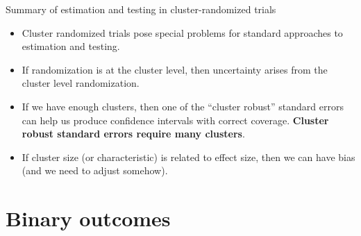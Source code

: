 \documentclass[
  ignorenonframetext,
]{beamer}
\begin{document}
\begin{frame}{Summary of estimation and testing in cluster-randomized
trials}
\protect\hypertarget{summary-of-estimation-and-testing-in-cluster-randomized-trials}{}
\begin{itemize}
\item
  Cluster randomized trials pose special problems for standard
  approaches to estimation and testing.
\item
  If randomization is at the cluster level, then uncertainty arises from
  the cluster level randomization.
\item
  If we have enough clusters, then one of the ``cluster robust''
  standard errors can help us produce confidence intervals with correct
  coverage. \textbf{Cluster robust standard errors require many
  clusters}.
\item
  If cluster size (or characteristic) is related to effect size, then we
  can have bias (and we need to adjust somehow).
\end{itemize}
\end{frame}

\hypertarget{binary-outcomes}{%
\section{Binary outcomes}\label{binary-outcomes}}
\end{document}
